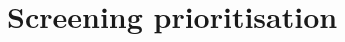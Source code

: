 \documentclass[10pt,oneside]{book}
\begin{document}


 
\section{Screening prioritisation}\label{sec:screening Priorisation}
\end{document}
